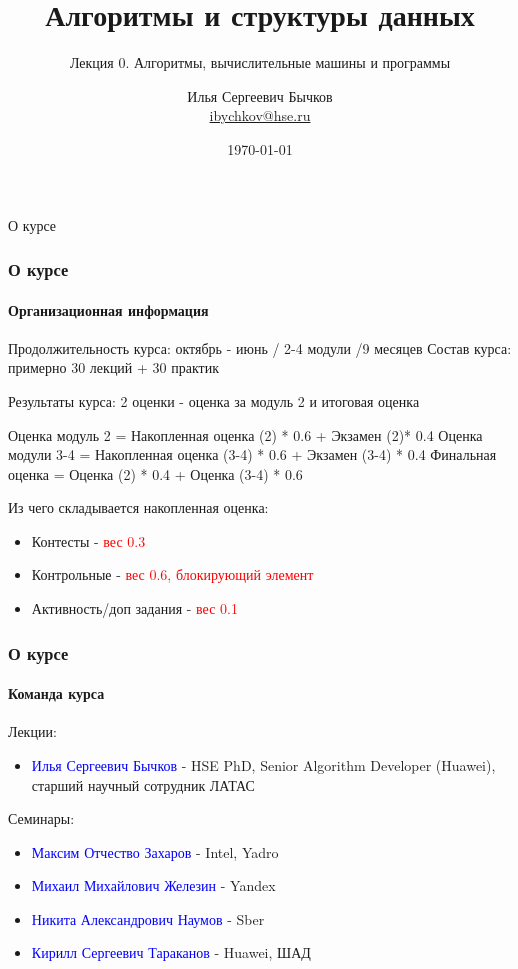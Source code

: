 \documentclass[aspectratio=169]{beamer}
\title[Title]{Алгоритмы и структуры данных}
\subtitle{Лекция 0. Алгоритмы, вычислительные машины и программы}
\author[Author's name]{Илья Сергеевич Бычков\\ \smallskip \scriptsize \url{ibychkov@hse.ru}}
\institute{НИУ ВШЭ - Нижний Новгород}
\date{\today}
\begin{document}
\frame[plain]{\titlepage}


\begin{frame}[c]

\begin{center}
\Huge О курсе
\end{center}

\end{frame}

\begin{frame}
\frametitle{О курсе}
\framesubtitle{Организационная информация}

Продолжительность курса: \quad октябрь - июнь / 2-4 модули /9 месяцев\newline
Состав курса: \quad примерно 30 лекций + 30 практик\newline

Результаты курса: 2 оценки  - оценка за модуль 2 и итоговая оценка\newline

Оценка модуль 2 = Накопленная оценка (2) * 0.6 + Экзамен (2)* 0.4\newline
Оценка модули 3-4 = Накопленная оценка (3-4) * 0.6 + Экзамен (3-4) * 0.4\newline
Финальная оценка = Оценка (2) * 0.4 + Оценка (3-4) * 0.6\newline

Из чего складывается накопленная оценка:
\begin{itemize}
  \item{Контесты - \textcolor{red}{вес 0.3}}
  \item{Контрольные - \textcolor{red}{вес 0.6, блокирующий элемент}}
  \item{Активность/доп задания - \textcolor{red}{вес 0.1}}
\end{itemize}
\end{frame}


\begin{frame}
\frametitle{О курсе}
\framesubtitle{Команда курса}
Лекции:
\begin{itemize}
\item{\textcolor{blue}{Илья Сергеевич Бычков} - HSE PhD, Senior Algorithm Developer (Huawei), старший научный сотрудник ЛАТАС}
\end{itemize}
Семинары:
\begin{itemize}
  \item{\textcolor{blue}{Максим Отчество Захаров} - Intel, Yadro}
  \item{\textcolor{blue}{Михаил Михайлович Железин} - Yandex}
  \item{\textcolor{blue}{Никита Александрович Наумов} - Sber}
  \item{\textcolor{blue}{Кирилл Сергеевич Тараканов} - Huawei, ШАД}
\end{itemize}
\end{frame}
\end{document}
